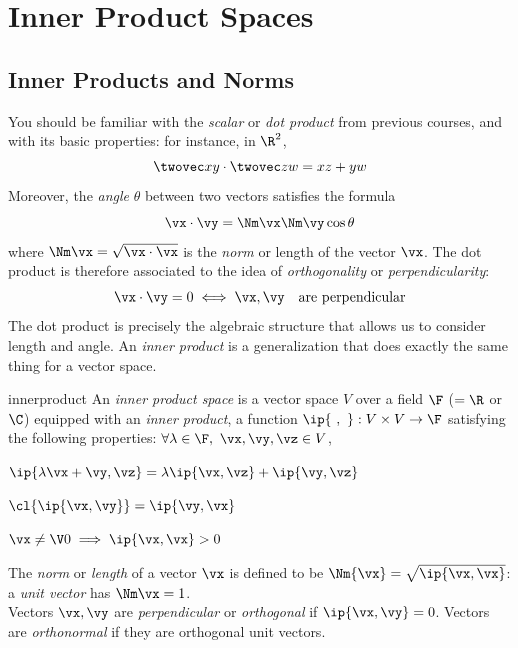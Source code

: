 \graphicspath{{notes/6inner/asy/}}

\setcounter{section}{5}

\section{Inner Product Spaces}

\subsection{Inner Products and Norms}

You should be familiar with the \emph{scalar} or \emph{dot product} from previous courses, and with its basic properties: for instance, in $\R^2$,
\[\twovec xy\cdot \twovec zw=xz+yw\]
Moreover, the \emph{angle} $\theta$ between two vectors satisfies the formula
\[\vx\cdot\vy=\Nm\vx\Nm\vy\cos\theta\]
where $\Nm\vx=\sqrt{\vx\cdot\vx}$ is the \emph{norm} or length of the vector $\vx$. The dot product is therefore associated to the idea of \emph{orthogonality} or \emph{perpendicularity}:
\[\vx\cdot\vy=0\iff \vx,\vy\quad\text{are perpendicular}\]
The dot product is precisely the algebraic structure that allows us to consider length and angle. An \emph{inner product} is a generalization that does exactly the same thing for a vector space.

\begin{defn}{}{innerproduct}
An \emph{inner product space} is a vector space $V$ over a field $\F$ ($=\R$ or $\C$) equipped with an \emph{inner product}, a function $\ip{\ ,\ }:V\times V\to\F$ satisfying the following properties: $\forall\lambda\in\F,\ \vx,\vy,\vz\in V$,
\begin{enumeratea}
  \item $\ip{\lambda\vx+\vy,\vz}=\lambda\ip{\vx,\vz}+\ip{\vy,\vz}$
  \item $\cl{\ip{\vx,\vy}}=\ip{\vy,\vx}$
  \item $\vx\neq \V0\implies \ip{\vx,\vx}>0$
\end{enumeratea}
The \emph{norm} or \emph{length} of a vector $\vx$ is defined to be $\Nm{\vx}=\sqrt{\ip{\vx,\vx}}$: a \emph{unit vector} has $\Nm\vx=1$.\\[5pt]
Vectors $\vx,\vy$ are \emph{perpendicular} or \emph{orthogonal} if $\ip{\vx,\vy}=0$. Vectors are \emph{orthonormal} if they are orthogonal unit vectors.
\end{defn}

